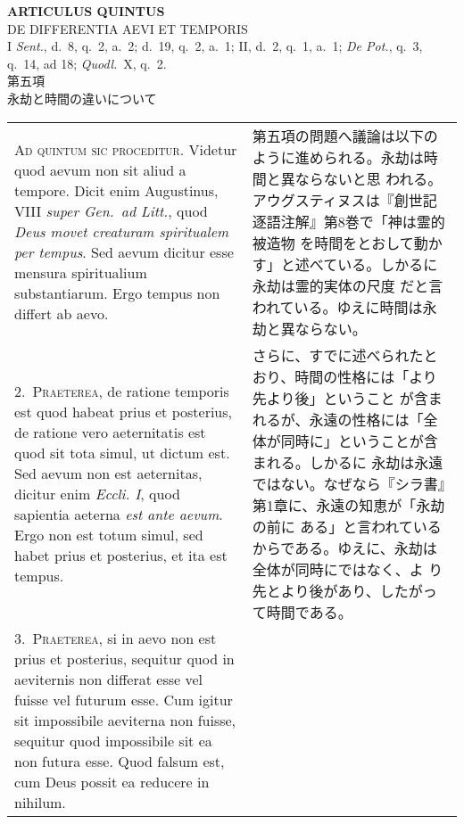 \documentclass[10pt]{jsarticle} %
\begin{document}
\newpage
{}


\begin{center}
 {\Large {\bf ARTICULUS QUINTUS}}\\
 {\large DE DIFFERENTIA AEVI ET TEMPORIS}\\
 {\footnotesize I {\itshape Sent.}, d.~8, q.~2, a.~2; d.~19, q.~2, a.~1;
 II, d.~2, q.~1, a.~1; {\itshape De Pot.}, q.~3, q.~14, ad 18; {\itshape
 Quodl.}~X, q.~2.}\\
 {\Large 第五項\\永劫と時間の違いについて}
\end{center}


\begin{longtable}{p{21em}p{21em}}

{\huge A}{\scshape d quintum sic proceditur}. Videtur quod aevum non sit
 aliud a tempore. Dicit enim Augustinus, VIII {\it super Gen.~ad Litt.},
 quod {\itshape Deus movet creaturam spiritualem per tempus}. Sed aevum dicitur
 esse mensura spiritualium substantiarum. Ergo tempus non differt ab
 aevo.


&

第五項の問題へ議論は以下のように進められる。永劫は時間と異ならないと思
われる。アウグスティヌスは『創世記逐語注解』第8巻で「神は霊的被造物
を時間をとおして動かす」と述べている。しかるに永劫は霊的実体の尺度
だと言われている。ゆえに時間は永劫と異ならない。


\\

2.~{\scshape Praeterea}, de ratione temporis est quod habeat prius et
 posterius, de ratione vero aeternitatis est quod sit tota simul, ut
 dictum est. Sed aevum non est aeternitas, dicitur enim {\it Eccli. I},
 quod sapientia aeterna {\itshape est ante aevum}. Ergo non est totum simul, sed
 habet prius et posterius, et ita est tempus.


&


さらに、すでに述べられたとおり、時間の性格には「より先より後」ということ
が含まれるが、永遠の性格には「全体が同時に」ということが含まれる。しかるに
永劫は永遠ではない。なぜなら『シラ書』第1章に、永遠の知恵が「永劫の前に
ある」と言われているからである。ゆえに、永劫は全体が同時にではなく、よ
り先とより後があり、したがって時間である。


\\



3.~{\scshape Praeterea}, si in aevo non est prius et posterius,
sequitur quod in aeviternis non differat esse vel fuisse vel futurum
esse. Cum igitur sit impossibile aeviterna non fuisse, sequitur quod
impossibile sit ea non futura esse. Quod falsum est, cum Deus possit
ea reducere in nihilum.


\end{longtable}
\end{document}
